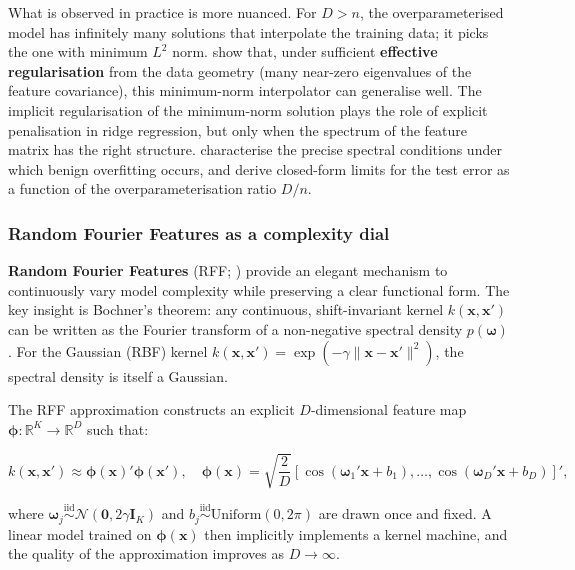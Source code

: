 What is observed in practice is more nuanced. For $D > n$, the overparameterised model has infinitely many solutions that interpolate the training data; it picks the one with minimum $L^2$ norm. \cite{bartlett2020benign} show that, under sufficient \textbf{effective regularisation} from the data geometry (many near-zero eigenvalues of the feature covariance), this minimum-norm interpolator can generalise well. The implicit regularisation of the minimum-norm solution plays the role of explicit penalisation in ridge regression, but only when the spectrum of the feature matrix has the right structure. \cite{hastie2022surprises} characterise the precise spectral conditions under which benign overfitting occurs, and derive closed-form limits for the test error as a function of the overparameterisation ratio $D/n$.

\subsubsection{Random Fourier Features as a complexity dial}\label{sec_comp_rff}

\textbf{Random Fourier Features} (RFF; \cite{rahimi2007random}) provide an elegant mechanism to continuously vary model complexity while preserving a clear functional form. The key insight is Bochner's theorem: any continuous, shift-invariant kernel $k(\mathbf{x}, \mathbf{x}')$ can be written as the Fourier transform of a non-negative spectral density $p(\boldsymbol{\omega})$. For the Gaussian (RBF) kernel $k(\mathbf{x}, \mathbf{x}') = \exp( -\gamma\|\mathbf{x} - \mathbf{x}'\|^2)$, the spectral density is itself a Gaussian.

The RFF approximation constructs an explicit $D$-dimensional feature map $\boldsymbol{\phi}: \mathbb{R}^K \to \mathbb{R}^D$ such that:

\begin{equation}
\label{eq-rff}
k(\mathbf{x}, \mathbf{x}') \approx \boldsymbol{\phi}(\mathbf{x})'\boldsymbol{\phi}(\mathbf{x}'), \quad \boldsymbol{\phi}(\mathbf{x}) = \sqrt{\frac{2}{D}}\left[\cos(\boldsymbol{\omega}_1'\mathbf{x}+b_1), \ldots, \cos(\boldsymbol{\omega}_D'\mathbf{x}+b_D)\right]',
\end{equation}

where $\boldsymbol{\omega}_j \overset{\text{iid}}{\sim} \mathcal{N}(\mathbf{0}, 2\gamma\mathbf{I}_K)$ and $b_j \overset{\text{iid}}{\sim} \mathrm{Uniform}(0, 2\pi)$ are drawn once and fixed. A linear model trained on $\boldsymbol{\phi}(\mathbf{x})$ then implicitly implements a kernel machine, and the quality of the approximation improves as $D \to \infty$.

